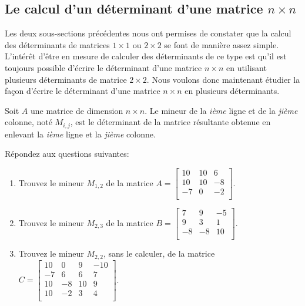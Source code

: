 \documentclass[]{book}
\providecommand{\tightlist}{%
  \setlength{\itemsep}{0pt}\setlength{\parskip}{0pt}}
\theoremstyle{definition}
\theoremstyle{definition}
\theoremstyle{definition}
\theoremstyle{remark}
\let\BeginKnitrBlock\begin \let\EndKnitrBlock\end
\begin{document}
\hypertarget{le-calcul-dun-determinant-dune-matrice-ntimes-n}{%
\subsection{\texorpdfstring{Le calcul d'un déterminant d'une matrice \(n\times n\)}{Le calcul d'un déterminant d'une matrice n\textbackslash times n}}\label{le-calcul-dun-determinant-dune-matrice-ntimes-n}}

Les deux sous-sections précédentes nous ont permises de constater que la calcul des déterminants de matrices \(1\times 1\) ou \(2\times 2\) se font de manière assez simple. L'intérêt d'être en mesure de calculer des déterminants de ce type est qu'il est toujours possible d'écrire le déterminant d'une matrice \(n\times n\) en utilisant plusieurs déterminants de matrice \(2\times 2\). Nous voulons donc maintenant étudier la façon d'écrire le déterminant d'une matrice \(n\times n\) en plusieurs déterminants.

\BeginKnitrBlock{definition}[Le mineur d'une matrice]
\protect\hypertarget{def:unnamed-chunk-87}{}{\label{def:unnamed-chunk-87} {} }Soit \(A\) une matrice de dimension \(n \times n\). Le mineur de la \emph{ième} ligne et de la \emph{jième} colonne, noté \(M_{i,j}\), est le déterminant de la matrice résultante obtenue en enlevant la \emph{ième} ligne et la \emph{jième} colonne.
\EndKnitrBlock{definition}

\BeginKnitrBlock{example}
\protect\hypertarget{exm:unnamed-chunk-88}{}{\label{exm:unnamed-chunk-88} }Répondez aux questions suivantes:

\begin{enumerate}
\def\labelenumi{\alph{enumi}.}
\tightlist
\item
  Trouvez le mineur \(M_{1,2}\) de la matrice \(A=\begin{bmatrix} 10&10&6\\ 10&10&-8\\ -7&0&-2\\ \end{bmatrix}\).
\item
  Trouvez le mineur \(M_{2,3}\) de la matrice \(B=\begin{bmatrix} 7&9&-5\\ 9&3&1\\ -8&-8&10\\ \end{bmatrix}\).
\item
  Trouvez le mineur \(M_{2,2}\), sans le calculer, de la matrice \(C=\begin{bmatrix} 10&0&9&-10\\ -7&6&6&7\\ 10&-8&10&9\\ 10&-2&3&4\\ \end{bmatrix}\).
\end{enumerate}
\EndKnitrBlock{example}
\end{document}
